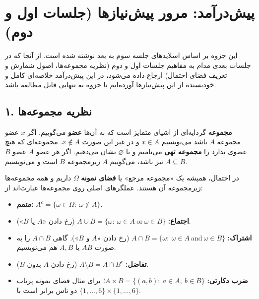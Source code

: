 \chapter*{پیش‌درآمد: مرور پیش‌نیازها (جلسات اول و دوم)}

\begin{note}
\notetitle این جزوه بر اساس اسلایدهای جلسه سوم به بعد نوشته شده است. از آنجا که در جلسات بعدی مدام به مفاهیم جلسات اول و دوم (نظریه مجموعه‌ها، اصول شمارش و تعریف فضای احتمال) ارجاع داده می‌شود، در این پیش‌درآمد خلاصه‌ای کامل و خودبسنده از این پیش‌نیازها آورده‌ایم تا جزوه به تنهایی قابل مطالعه باشد.
\end{note}

\section*{۱. نظریه مجموعه‌ها}

\textbf{مجموعه} گردایه‌ای از اشیای متمایز است که به آن‌ها \textbf{عضو} می‌گوییم. اگر $x$ عضو مجموعه $A$ باشد می‌نویسیم $x\in A$ و در غیر این صورت $x\notin A$. مجموعه‌ای که هیچ عضوی ندارد را \textbf{مجموعه تهی} می‌نامیم و با $\varnothing$ نشان می‌دهیم. اگر هر عضو $A$ عضو $B$ نیز باشد، می‌گوییم $A$ زیرمجموعه $B$ است و می‌نویسیم $A\subseteq B$.

در احتمال، همیشه یک «مجموعه مرجع» یا \textbf{فضای نمونه} $\Omega$ داریم و همه مجموعه‌ها زیرمجموعه آن هستند. عملگرهای اصلی روی مجموعه‌ها عبارت‌اند از:
\begin{itemize}
\item \textbf{متمم:} $A^c=\{\omega\in\Omega:\ \omega\notin A\}$.
\item \textbf{اجتماع:} $A\cup B=\{\omega:\ \omega\in A \ \text{or}\ \omega\in B\}$ (رخ دادن «$A$ یا $B$»).
\item \textbf{اشتراک:} $A\cap B=\{\omega:\ \omega\in A \ \text{and}\ \omega\in B\}$ (رخ دادن «$A$ و $B$»). گاهی $A\cap B$ را به صورت $AB$ یا $A,B$ هم می‌نویسیم.
\item \textbf{تفاضل:} $A\setminus B=A\cap B^c$ (رخ دادن $A$ بدون $B$).
\item \textbf{ضرب دکارتی:} $A\times B=\{(a,b):\ a\in A,\ b\in B\}$؛ برای مثال فضای نمونه پرتاب دو تاس برابر است با $\{1,\dots,6\}\times\{1,\dots,6\}$.
\end{itemize}

